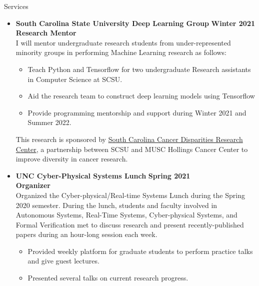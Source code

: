 \documentclass{resume} %
\begin{document}
\begin{rSection}{Services}

\begin{itemize}[leftmargin=*]
  \item
      {\bf South Carolina State University Deep Learning Group} \hfill {\bf Winter 2021} \\
        {\bf Research Mentor} \\
      I will mentor undergraduate research students from under-represented minority groups in performing Machine Learning research as follows:

      \begin{itemize}[label=$\blackdiamond$]
        \item Teach Python and Tensorflow for two undergraduate Research assistants in Computer Science at SCSU.
        \item Aid the research team to construct deep learning models using Tensorflow
        \item Provide programming mentorship and support during Winter 2021 and Summer 2022.
      \end{itemize}

      This research is sponsored by \href{https://hollingscancercenter.musc.edu/outreach/statewide-commitments/sc-cadre}{South Carolina Cancer Disparities Research Center}, a partnership between SCSU and MUSC Hollings Cancer Center to improve diversity in cancer research.

      \item
      {\bf UNC Cyber-Physical Systems Lunch } \hfill {\bf Spring 2021}\\
      {\bf Organizer} \\
      Organized the Cyber-physical/Real-time Systems Lunch during the Spring 2020 semester. During the lunch, students and faculty involved in Autonomous Systems, Real-Time Systems, Cyber-physical Systems, and Formal Verification met to discuss research and present recently-published papers during an hour-long session each week.
      \begin{itemize}[label=$\blackdiamond$]
        \item Provided weekly platform for graduate students to perform practice talks and give guest lectures.
        \item Presented several talks on current research progress.
      \end{itemize}
\end{itemize}
\end{rSection}
\end{document}
